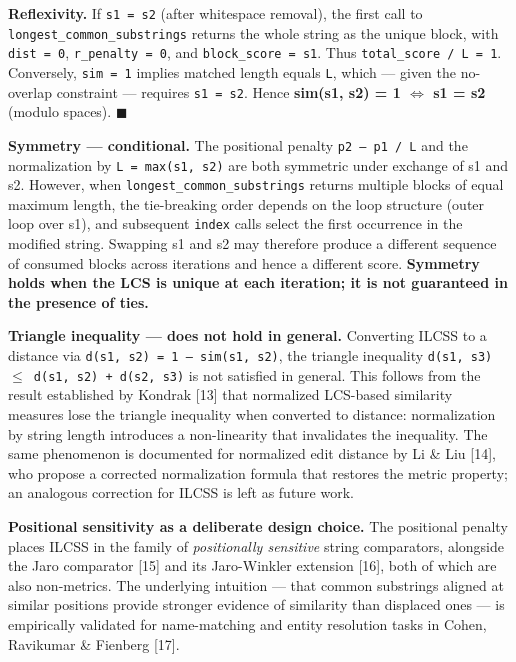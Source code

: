 \documentclass[
  11pt,
]{article}
\begin{document}
\textbf{Reflexivity.} If \texttt{s1\ =\ s2} (after whitespace removal),
the first call to \texttt{longest\_common\_substrings} returns the whole
string as the unique block, with \texttt{dist\ =\ 0},
\texttt{r\_penalty\ =\ 0}, and
\texttt{block\_score\ =\ \textbar{}s1\textbar{}}. Thus
\texttt{total\_score\ /\ L\ =\ 1}. Conversely, \texttt{sim\ =\ 1}
implies matched length equals \texttt{L}, which --- given the no-overlap
constraint --- requires \texttt{s1\ =\ s2}. Hence \textbf{sim(s1, s2) =
1 $\Longleftrightarrow$ s1 = s2} (modulo spaces). $\blacksquare$

\textbf{Symmetry --- conditional.} The positional penalty
\texttt{\textbar{}p2\ --\ p1\textbar{}\ /\ L} and the normalization by
\texttt{L\ =\ max(\textbar{}s1\textbar{},\ \textbar{}s2\textbar{})} are
both symmetric under exchange of s1 and s2. However, when
\texttt{longest\_common\_substrings} returns multiple blocks of equal
maximum length, the tie-breaking order depends on the loop structure
(outer loop over s1), and subsequent \texttt{index} calls select the
first occurrence in the modified string. Swapping s1 and s2 may
therefore produce a different sequence of consumed blocks across
iterations and hence a different score. \textbf{Symmetry holds when the
LCS is unique at each iteration; it is not guaranteed in the presence of
ties.}

\textbf{Triangle inequality --- does not hold in general.} Converting
ILCSS to a distance via \texttt{d(s1,\ s2)\ =\ 1\ --\ sim(s1,\ s2)}, the
triangle inequality \texttt{d(s1,\ s3)\ $\leq$\ d(s1,\ s2)\ +\ d(s2,\ s3)} is
not satisfied in general. This follows from the result established by
Kondrak {[}13{]} that normalized LCS-based similarity measures lose the
triangle inequality when converted to distance: normalization by string
length introduces a non-linearity that invalidates the inequality. The
same phenomenon is documented for normalized edit distance by Li \& Liu
{[}14{]}, who propose a corrected normalization formula that restores
the metric property; an analogous correction for ILCSS is left as future
work.

\textbf{Positional sensitivity as a deliberate design choice.} The
positional penalty places ILCSS in the family of \emph{positionally
sensitive} string comparators, alongside the Jaro comparator {[}15{]}
and its Jaro-Winkler extension {[}16{]}, both of which are also
non-metrics. The underlying intuition --- that common substrings aligned
at similar positions provide stronger evidence of similarity than
displaced ones --- is empirically validated for name-matching and entity
resolution tasks in Cohen, Ravikumar \& Fienberg {[}17{]}.
\end{document}
